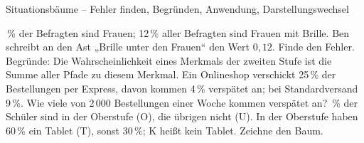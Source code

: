 \begin{aufgabe}{Situationsbäume – Fehler finden, Begründen, Anwendung, Darstellungswechsel}
\begin{teile}
\,\% der Befragten sind Frauen; 12\,\% aller Befragten sind Frauen mit Brille. Ben schreibt an den Ast „Brille unter den Frauen“ den Wert $0{,}12$. Finde den Fehler.
\teil Begründe: Die Wahrscheinlichkeit eines Merkmals der zweiten Stufe ist die Summe aller Pfade zu diesem Merkmal.
\teil Ein Onlineshop verschickt 25\,\% der Bestellungen per Express, davon kommen 4\,\% verspätet an; bei Standardversand 9\,\%. Wie viele von 2\,000 Bestellungen einer Woche kommen verspätet an? \leerfeld
{}\,\% der Schüler sind in der Oberstufe (O), die übrigen nicht (U). In der Oberstufe haben 60\,\% ein Tablet (T), sonst 30\,\%; K heißt kein Tablet. Zeichne den Baum.

\end{teile}
\end{aufgabe}
